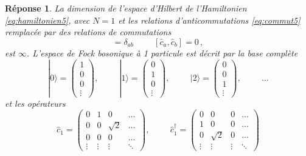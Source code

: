 \documentclass{article}
\numberwithin{equation}{section}
\theoremstyle{solution}
\newtheorem{solution}{Réponse}[section]
\begin{document}
\begin{solution}
        La dimension de l'espace d'Hilbert de l'Hamiltonien \eqref{eq:hamiltonien5}, avec $N=1$ et les relations  
        d'anticommutations \eqref{eq:commut5} remplacée par des relations de commutations
        \begin{equation}
                [\hat{c}_a, \hat{c}^{\dagger}_b ] = \delta_{ab} \hspace{1cm} [ \hat{c}_a, \hat{c}_b] = 0\, ,
        \end{equation} 
        est $\infty$. L'espace de Fock bosonique à 1 particule est décrit par la base complète
        \begin{equation}
                | 0 \rangle = \begin{pmatrix}
                        1 \\ 0 \\ 0 \\\vdots
                \end{pmatrix},
                \hspace{1cm} 
                | 1 \rangle = \begin{pmatrix}
                        0 \\ 1 \\ 0 \\\vdots
                \end{pmatrix},
                \hspace{1cm} 
                | 2 \rangle = \begin{pmatrix}
                        0 \\ 0 \\ 1 \\ \vdots
                \end{pmatrix},
                \hspace{1cm}
                 \dots
        \end{equation} 
        et les opérateurs
        \begin{equation}
                \hat{c}_1 = \begin{pmatrix}
                        0 & 1 & 0 & \dots \\
                        0 & 0 & \sqrt{2} & \dots \\
                        0 & 0 & 0 & \dots \\
                        \vdots & \vdots & \vdots & \ddots
                \end{pmatrix}
                ,\hspace{1cm}
                \hat{c}^{\dagger}_1 = \begin{pmatrix}
                        0 & 0 & 0 &  \dots \\
                        1 & 0 & 0 &  \dots \\
                        0 & \sqrt{2} & 0 &  \dots  \\
                        \vdots & \vdots & \vdots & \ddots 
                \end{pmatrix}
        \end{equation} 
\end{solution}
\end{document}
